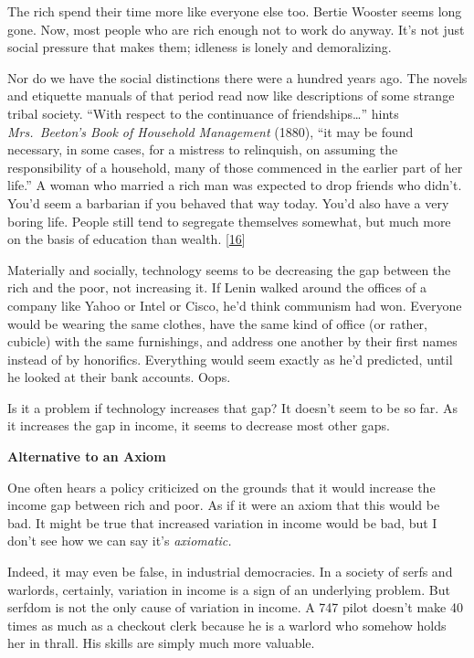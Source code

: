 The rich spend their time more like everyone else too. Bertie Wooster
seems long gone. Now, most people who are rich enough not to work do
anyway. It's not just social pressure that makes them; idleness is
lonely and demoralizing.

Nor do we have the social distinctions there were a hundred years ago.
The novels and etiquette manuals of that period read now like
descriptions of some strange tribal society. ``With respect to the
continuance of friendships\ldots{}'' hints \emph{Mrs.~Beeton's Book of
Household Management} (1880), ``it may be found necessary, in some
cases, for a mistress to relinquish, on assuming the responsibility of a
household, many of those commenced in the earlier part of her life.'' A
woman who married a rich man was expected to drop friends who didn't.
You'd seem a barbarian if you behaved that way today. You'd also have a
very boring life. People still tend to segregate themselves somewhat,
but much more on the basis of education than wealth.
{[}\hyperref[f16n]{16}{]}

Materially and socially, technology seems to be decreasing the gap
between the rich and the poor, not increasing it. If Lenin walked around
the offices of a company like Yahoo or Intel or Cisco, he'd think
communism had won. Everyone would be wearing the same clothes, have the
same kind of office (or rather, cubicle) with the same furnishings, and
address one another by their first names instead of by honorifics.
Everything would seem exactly as he'd predicted, until he looked at
their bank accounts. Oops.

Is it a problem if technology increases that gap? It doesn't seem to be
so far. As it increases the gap in income, it seems to decrease most
other gaps.

\textbf{Alternative to an Axiom}

One often hears a policy criticized on the grounds that it would
increase the income gap between rich and poor. As if it were an axiom
that this would be bad. It might be true that increased variation in
income would be bad, but I don't see how we can say it's
\emph{axiomatic.}

Indeed, it may even be false, in industrial democracies. In a society of
serfs and warlords, certainly, variation in income is a sign of an
underlying problem. But serfdom is not the only cause of variation in
income. A 747 pilot doesn't make 40 times as much as a checkout clerk
because he is a warlord who somehow holds her in thrall. His skills are
simply much more valuable.


